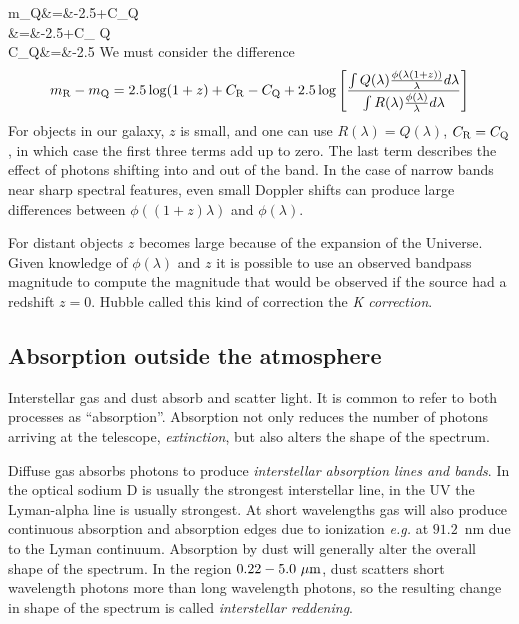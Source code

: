 \bua
m_{\rm Q}&=&-2.5+C_{\rm Q} \\
                &=&-2.5\log{}+C_{\rm
                  Q} \\
C_{\rm Q}&=&-2.5
\eua
We must consider the difference
\[
m_{\rm R}-m_{\rm Q}=2.5\log(1+z)
+C_{\rm R}-C_{\rm Q}+2.5\log\left[
  \frac{\int  Q(\lambda)\frac{\phi(\lambda(1+z))}{\lambda}d\lambda}{\int R(\lambda)\frac{\phi(\lambda)}{\lambda}d\lambda}\right]
\]
For objects in our galaxy, $z$ is small, and one can use
$R(\lambda)=Q(\lambda)$, $C_{\rm R}=C_{\rm Q}$, in which case the
first three terms add up to zero. The last term describes the effect
of photons shifting into and out of the band. In the case of narrow
bands near sharp spectral features, even small Doppler shifts can
produce large differences between $\phi((1+z)\lambda)$ and
$\phi(\lambda)$. 

For distant objects $z$ becomes large because of the expansion of the
Universe. Given knowledge of $\phi(\lambda)$ and $z$ it is possible to
use an observed bandpass magnitude to compute the magnitude that
would be observed if the source had a redshift $z=0$. Hubble called
this kind of correction the {\it K correction}. 
%
\subsection{Absorption outside the atmosphere}
Interstellar gas and dust absorb and scatter light. It is common to
refer to both processes as ``absorption''. Absorption not only reduces
the number of photons arriving at the telescope, {\it extinction}, but
also alters the shape of the spectrum.

Diffuse gas absorbs photons to produce {\it interstellar absorption
  lines and bands}. In the optical sodium D is usually the strongest
interstellar line, in the UV the Lyman-alpha line is usually
strongest. At short wavelengths gas will also produce continuous
absorption and absorption edges due to ionization {\it e.g.} at
$91.2$~nm due to the Lyman continuum. Absorption by dust will
generally alter the overall shape of the spectrum. In the region
$0.22-5.0~\mu{\rm m}$, dust scatters short wavelength photons more
than long wavelength photons, so the resulting change in shape of the
spectrum is called {\it interstellar reddening}. 

